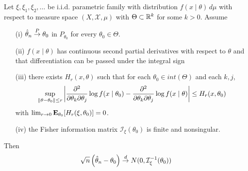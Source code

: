\begin{thm}Let $\xi, \xi_1, \xi_2, \dots$ be i.i.d. parametric
  family with distribution $f(x \mid \theta) \, d \mu$ with respect to measure
  space $(X, \mathcal{X}, \mu)$ with $\Theta \subset \reals^k$
  for some $k > 0$.  Assume
\begin{itemize}
\item[(i)]$\hat{\theta}_n \toprob \theta_0$ in $P_{\theta_0}$ for every
  $\theta_0 \in \Theta$.
\item[(ii)]$f(x \mid \theta)$ has continuous second partial
  derivatives with respect to $\theta$ and that differentiation can be
  passed under the integral sign
\item[(iii)]there exists $H_r(x, \theta)$ such that for each $\theta_0
  \in int(\Theta)$ and each $k,j$,
\begin{align*}
\sup_{\norm{\theta - \theta_0} \leq r}
\abs{\frac{\partial^2}{\partial\theta_k \partial\theta_j} \log f(x
  \mid \theta_0) - \frac{\partial^2}{\partial\theta_k \partial\theta_j} \log f(x
  \mid \theta)} \leq H_r(x, \theta_0)
\end{align*}
with $\lim_{r \to 0} \sexpectation{H_r(\xi, \theta_0)}{\theta_0} = 0$.
\item[(iv)]the Fisher information matrix $\mathcal{I}_\xi(\theta_0)$ is
  finite and nonsingular.
\end{itemize}
Then 
\begin{align*}
\sqrt{n} \left(\hat{\theta}_n - \theta_0\right ) \todist N(0, \mathcal{I}^{-1}_\xi(\theta_0))
\end{align*}
\end{thm}
